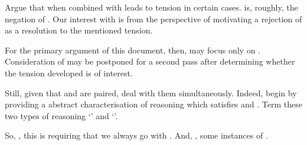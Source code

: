 \begin{note}
  Argue that \ESU{} when combined with \ideaCS{} leads to tension in certain cases.
  \EAS{} is, roughly, the negation of \ideaCS{}.
  Our interest with \EAS{} is from the perspective of motivating a rejection of \ESU{} as a resolution to the mentioned tension.

  For the primary argument of this document, then, may focus only on \ESU{}.
  Consideration of \EAS{} may be postponed for a second pass after determining whether the tension developed is of interest.

  Still, given that \ESU{} and \EAS{} are paired, deal with them simultaneously.
  Indeed, begin by providing a abstract characterisation of reasoning which satisfies \ESU{} and \EAS{}.
  Term these two types of reasoning `\adA{}' and `\adB{}'.
\end{note}

\begin{note}
\end{note}

\begin{note}
\end{note}

\begin{note}
  So, \ESU{}, this is requiring that we always go with \adA{}.
  And, \EAS{}, some instances of \adB{}.
\end{note}

